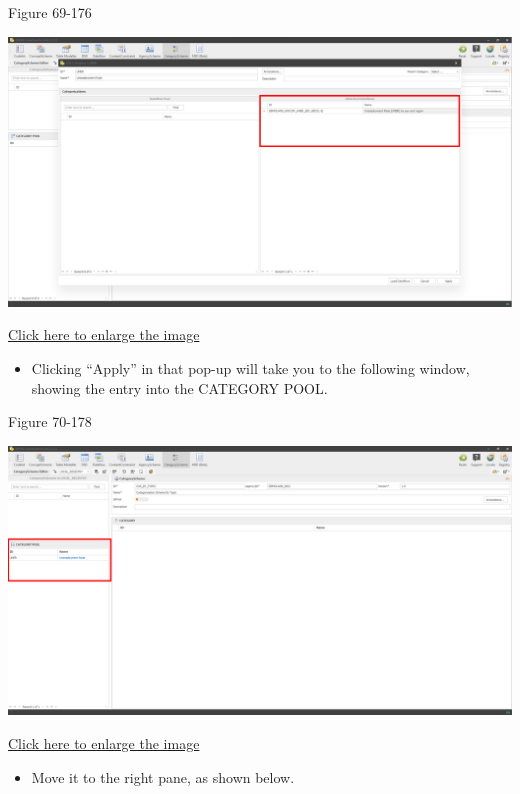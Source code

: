 \documentclass[
]{book}
\providecommand{\tightlist}{%
  \setlength{\itemsep}{0pt}\setlength{\parskip}{0pt}}
\theoremstyle{definition}
\theoremstyle{definition}
\theoremstyle{definition}
\theoremstyle{definition}
\theoremstyle{remark}
\begin{document}
Figure 69-176

\begin{center}\includegraphics[width=1\linewidth]{./images/image176} \end{center}

\href{images/image176.png}{Click here to enlarge the image}

\begin{itemize}
\tightlist
\item
  Clicking ``Apply'' in that pop-up will take you to the following window, showing the entry into the CATEGORY POOL.
\end{itemize}

Figure 70-178

\begin{center}\includegraphics[width=1\linewidth]{./images/image178} \end{center}

\href{images/image178.png}{Click here to enlarge the image}

\begin{itemize}
\tightlist
\item
  Move it to the right pane, as shown below.
\end{itemize}
\end{document}
